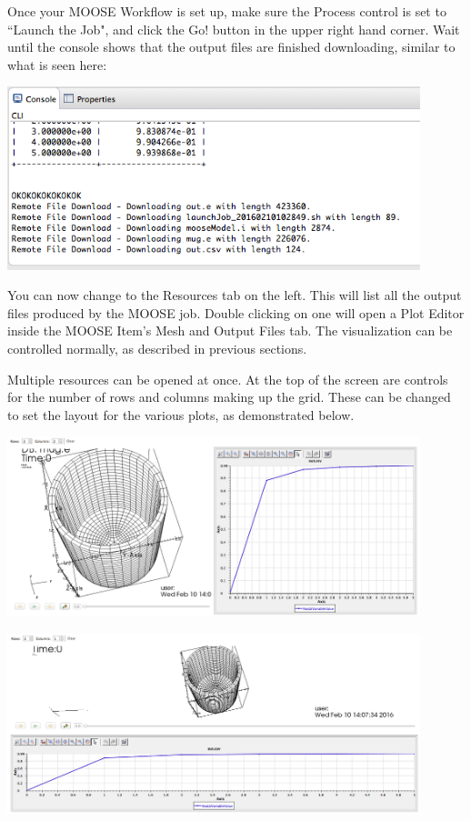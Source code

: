 Once your MOOSE Workflow is set up, make sure the Process control is set to
``Launch the Job", and click the Go! button in the upper right hand corner. Wait
until the console shows that the output files are finished downloading, similar
to what is seen here:

\begin{center} 
\includegraphics[width=12cm]{images/MOOSEJobConsoleOutput} 
\end{center}

You can now change to the Resources tab on the left. This will list all the
output files produced by the MOOSE job. Double clicking on one will open a Plot
Editor inside the MOOSE Item's Mesh and Output Files tab. The visualization can
be controlled normally, as described in previous sections.  

Multiple resources can be opened at once. At the top of the screen are controls
for the number of rows and columns making up the grid. These can be changed to
set the layout for the various plots, as demonstrated below.

\begin{center}
\includegraphics[width=12cm]{images/MOOSEEmbeddedHorizontal}
\end{center}

\begin{center}
\includegraphics[width=12cm]{images/MOOSEEmbeddedVertical}
\end{center}

